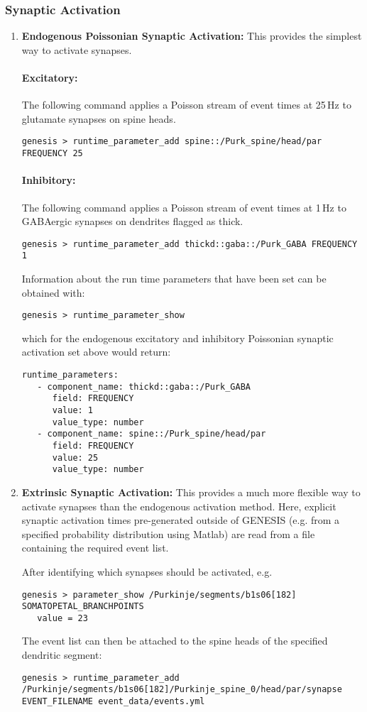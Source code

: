 \documentclass[12pt]{article}
\begin{document}
\subsubsection*{Synaptic Activation}
\begin{enumerate}
   \item{\bf Endogenous Poissonian Synaptic Activation:} This provides the simplest way to activate synapses.
   \paragraph{Excitatory:} The following command applies a Poisson stream of event times at 25\,Hz to glutamate synapses on spine heads.
\begin{verbatim}
genesis > runtime_parameter_add spine::/Purk_spine/head/par FREQUENCY 25
\end{verbatim}
   \paragraph{Inhibitory:} The following command applies a Poisson stream of event times at 1\,Hz to GABAergic synapses on dendrites flagged as thick.
\begin{verbatim}
genesis > runtime_parameter_add thickd::gaba::/Purk_GABA FREQUENCY 1
\end{verbatim}
Information about the run time parameters that have been set can be obtained with:
\begin{verbatim}
genesis > runtime_parameter_show
\end{verbatim}
which for the endogenous excitatory and inhibitory Poissonian synaptic activation set above would return:
\begin{verbatim} 
runtime_parameters:
   - component_name: thickd::gaba::/Purk_GABA
      field: FREQUENCY
      value: 1
      value_type: number
   - component_name: spine::/Purk_spine/head/par
      field: FREQUENCY
      value: 25
      value_type: number
 \end{verbatim}
    
   \item{\bf Extrinsic Synaptic Activation:} This provides a much more flexible way to activate synapses than the endogenous activation method. Here, explicit synaptic activation times pre-generated outside of GENESIS (e.g. from a specified probability distribution using Matlab) are read from a file containing the required event list.
   
   After identifying which synapses should be activated, e.g.
   \begin{verbatim}
genesis > parameter_show /Purkinje/segments/b1s06[182] SOMATOPETAL_BRANCHPOINTS
   value = 23 
   \end{verbatim}
   The event list can then be attached to the spine heads of the specified dendritic segment:
   \begin{verbatim}
genesis > runtime_parameter_add /Purkinje/segments/b1s06[182]/Purkinje_spine_0/head/par/synapse EVENT_FILENAME event_data/events.yml
   \end{verbatim}   
\end{enumerate}
\end{document}

